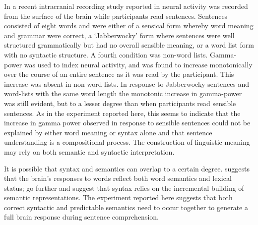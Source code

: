 \documentclass[10pt,letterpaper]{article}
\begin{document}

In a recent intracranial recording study reported in
\cite{FedorenkoEtAl2016} neural activity was recorded from the surface
of the brain while participants read sentences. Sentences consisted of
eight words and were either of a sensical form whereby word meaning
and grammar were correct, a \lq{}Jabberwocky\rq{} form where sentences were
well structured grammatically but had no overall sensible meaning, or
a word list form with no syntactic structure. A fourth condition was
non-word lists. Gamma-power was used to index neural activity, and was
found to increase monotonically over the course of an entire sentence
as it was read by the participant. This increase was absent in
non-word lists. In response to Jabberwocky sentences and word-lists
with the same word length the monotonic increase in gamma-power was
still evident, but to a lesser degree than when participants read
sensible sentences. As in the experiment reported here, this seems to
indicate that the increase in gamma power observed in response to
sensible sentences could not be explained by either word meaning or
syntax alone and that sentence understanding is a compositional
process. The construction of linguistic meaning may rely on both
semantic and syntactic interpretation.

It is possible that syntax and semantics can overlap to a certain
degree. \cite{Pulvermuller2002} suggests that the brain's responses to
words reflect both word semantics and lexical status;
\cite{KempsonEtAl2016} go further and suggest that syntax relies on
the incremental building of semantic representations. The experiment
reported here suggests that both correct syntactic and predictable
semantics need to occur together to generate a full brain response
during sentence comprehension. 

%

\end{document}

